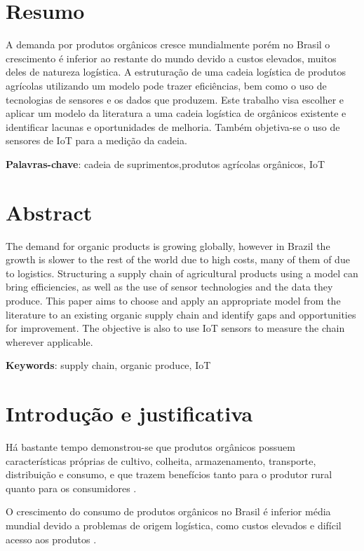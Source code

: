 \documentclass[
	12pt,				%
	openright,			%
	oneside,			%
	a4paper,			%
	english,			%
	french,				%
	spanish,			%
	brazil,				%
	]{abntex2}
\begin{document}
\frenchspacing 

\imprimircapa
\imprimirfolhaderosto

\chapter*{Resumo}
A demanda por produtos orgânicos cresce mundialmente porém no Brasil o crescimento é inferior ao restante do mundo devido a custos elevados, muitos deles de natureza logística. A estruturação de uma cadeia logística de produtos agrícolas utilizando um modelo pode trazer eficiências, bem como o uso de tecnologias de sensores e os dados que produzem. 
Este trabalho visa escolher e aplicar um modelo da literatura a uma cadeia logística de orgânicos existente e identificar lacunas e oportunidades de melhoria. Também objetiva-se o uso de sensores de IoT para a medição da cadeia.

\textbf{Palavras-chave}: cadeia de suprimentos,produtos agrícolas orgânicos, IoT

\chapter*{Abstract}
The demand for organic products is growing globally, however in Brazil the growth is slower to the rest of the world due to high costs, many of them of due to logistics. Structuring a supply chain of agricultural products using a model can bring efficiencies, as well as the use of sensor technologies and the data they produce.
This paper aims to choose and apply an appropriate model from the literature to an existing organic supply chain and identify gaps and opportunities for improvement. The objective is also to use IoT sensors to measure the chain wherever applicable.

\textbf{Keywords}: supply chain, organic produce, IoT

\chapter{Introdução e justificativa}

Há bastante tempo demonstrou-se que produtos orgânicos possuem características próprias de cultivo, colheita, armazenamento, transporte, distribuição e consumo, e que trazem benefícios tanto para o produtor rural  quanto para os consumidores .

O crescimento do consumo de produtos orgânicos no Brasil é inferior média mundial devido a problemas de origem logística, como custos elevados e difícil acesso aos produtos . 
\end{document}
